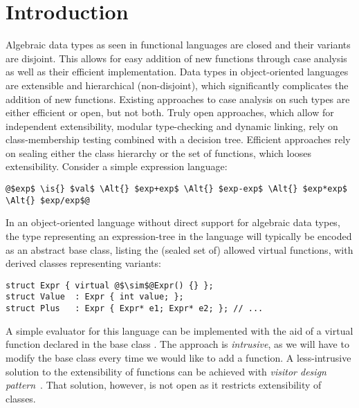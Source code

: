 \section{Introduction} %
\label{sec:intro}


Algebraic data types as seen in functional languages are closed and their 
variants are disjoint. This allows for easy addition of new functions through 
case analysis as well as their efficient implementation. Data types in 
object-oriented languages are extensible and hierarchical (non-disjoint), which 
significantly complicates the addition of new functions. Existing approaches to 
case analysis on such types are either efficient or open, but not both. Truly 
open approaches, which allow for independent extensibility, modular 
type-checking and dynamic linking, rely on class-membership testing combined 
with a decision tree. Efficient approaches rely on sealing either the class 
hierarchy or the set of functions, which looses extensibility. Consider a simple 
expression language:

\begin{lstlisting}
@$exp$ \is{} $val$ \Alt{} $exp+exp$ \Alt{} $exp-exp$ \Alt{} $exp*exp$ \Alt{} $exp/exp$@
\end{lstlisting}

\noindent 
In an object-oriented language without direct support for algebraic data types, 
the type representing an expression-tree in the language will typically be 
encoded as an abstract base class, listing the (sealed set of) allowed virtual 
functions, with derived classes representing variants:

\begin{lstlisting}[keepspaces,columns=flexible]
struct Expr { virtual @$\sim$@Expr() {} };
struct Value  : Expr { int value; };
struct Plus   : Expr { Expr* e1; Expr* e2; }; // ...
\end{lstlisting}

\noindent
A simple evaluator for this language can be implemented with the aid of a
virtual function  declared in the base class . 
The approach is \emph{intrusive}, as we will have to modify the base class every 
time we would like to add a function. A less-intrusive solution to the 
extensibility of functions can be achieved with \emph{visitor design 
pattern}~\cite{DesignPatterns1993}. That solution, however, is not open as it 
restricts extensibility of classes.

